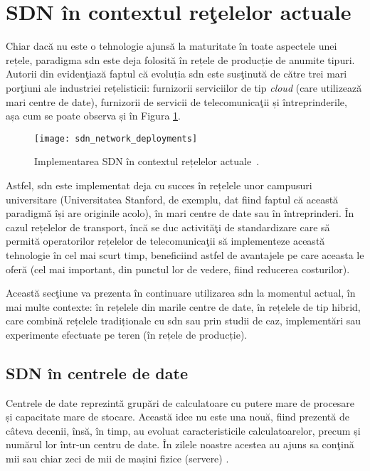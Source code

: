 \section{SDN în contextul reţelelor actuale}

Chiar dacă nu este o tehnologie ajunsă la maturitate în toate aspectele unei rețele, paradigma \gls{sdn} este deja folosită în rețele de producție de anumite tipuri. Autorii din \cite{alvizu2017comprehensive} evidenţiază faptul că evoluția \gls{sdn} este susţinută de către trei mari porţiuni ale industriei rețelisticii: furnizorii serviciilor de tip \textit{cloud} (care utilizează mari centre de date), furnizorii de servicii de telecomunicaţii și întreprinderile, așa cum se poate observa și în Figura \ref{fig:sdn_network_deployments}. 

\begin{figure}[h]
	\centering
	\texttt{[image: sdn\_network\_deployments]}
	\caption{Implementarea SDN în contextul rețelelor actuale~\cite{alvizu2017comprehensive}.}
	\label{fig:sdn_network_deployments}
\end{figure}

Astfel, \gls{sdn} este implementat deja cu succes în rețelele unor campusuri universitare (Universitatea Stanford, de exemplu, dat fiind faptul că această paradigmă își are originile acolo), în mari centre de date sau în întreprinderi. În cazul rețelelor de transport, încă se duc activităţi de standardizare care să permită operatorilor rețelelor de telecomunicaţii să implementeze această tehnologie în cel mai scurt timp, beneficiind astfel de avantajele pe care aceasta le oferă (cel mai important, din punctul lor de vedere, fiind reducerea costurilor).

Această secţiune va prezenta în continuare utilizarea \gls{sdn} la momentul actual, în mai multe contexte: în rețelele din marile centre de date, în rețelele de tip hibrid, care combină rețelele tradiționale cu \gls{sdn} sau prin studii de caz, implementări sau experimente efectuate pe teren (în rețele de producție).

\subsection{SDN în centrele de date}

Centrele de date reprezintă grupări de calculatoare cu putere mare de procesare și capacitate mare de stocare. Această idee nu este una nouă, fiind prezentă de câteva decenii, însă, în timp, au evoluat caracteristicile calculatoarelor, precum și numărul lor într-un centru de date. În zilele noastre acestea au ajuns sa conţină mii sau chiar zeci de mii de mașini fizice (servere) \cite{goransson2016software}.


